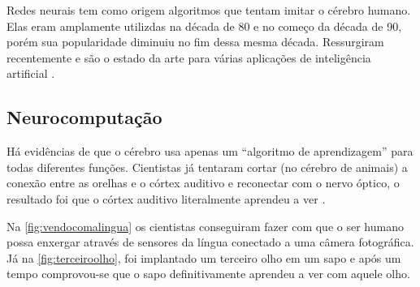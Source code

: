 Redes neurais tem como origem algoritmos que tentam imitar o cérebro humano. Elas eram amplamente utilizdas na década de 80 e no começo da década de 90, porém sua popularidade diminuiu no fim dessa mesma década. Ressurgiram recentemente e são o estado da arte para várias aplicações de inteligência artificial \cite{machinelearningcoursera}.

\subsection{Neurocomputação}

Há evidências de que o cérebro usa apenas um ``algoritmo de aprendizagem'' para todas diferentes funções. Cientistas já tentaram cortar (no cérebro de animais) a conexão entre as orelhas e o córtex auditivo e reconectar com o nervo óptico, o resultado foi que o córtex auditivo literalmente aprendeu a ver \cite{machinelearningcoursera}. 

Na \autoref{fig:vendocomalingua} os cientistas conseguiram fazer com que o ser humano possa enxergar através de sensores da língua conectado a uma câmera fotográfica. Já na \autoref{fig:terceiroolho}, foi implantado um terceiro olho em um sapo e após um tempo comprovou-se que o sapo definitivamente aprendeu a ver com aquele olho.


